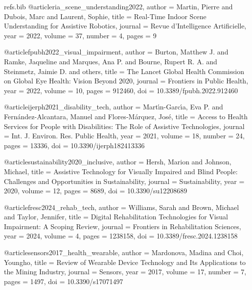 \begin{filecontents*}{refs.bib}
@article{ria_scene_understanding2022,
  author    = {Martin, Pierre and Dubois, Marc and Laurent, Sophie},
  title     = {Real-Time Indoor Scene Understanding for Assistive Robotics},
  journal   = {Revue d'Intelligence Artificielle},
  year      = {2022},
  volume    = {37},
  number    = {4},
  pages     = {9}
}


@article{fpubh2022_visual_impairment,
  author    = {Burton, Matthew J. and Ramke, Jaqueline and Marques, Ana P. and Bourne, Rupert R. A. and Steinmetz, Jaimie D. and others},
  title     = {The Lancet Global Health Commission on Global Eye Health: Vision Beyond 2020},
  journal   = {Frontiers in Public Health},
  year      = {2022},
  volume    = {10},
  pages     = {912460},
  doi       = {10.3389/fpubh.2022.912460}
}

@article{ijerph2021_disability_tech,
  author    = {Mart{\'\i}n-Garc{\'\i}a, Eva P. and Fern{\'a}ndez-Alcantara, Manuel and Flores-M{\'a}rquez, Jos{\'e}},
  title     = {Access to Health Services for People with Disabilities: The Role of Assistive Technologies},
  journal   = {Int. J. Environ. Res. Public Health},
  year      = {2021},
  volume    = {18},
  number    = {24},
  pages     = {13336},
  doi       = {10.3390/ijerph182413336}
}

@article{sustainability2020_inclusive,
  author    = {Hersh, Marion and Johnson, Michael},
  title     = {Assistive Technology for Visually Impaired and Blind People: Challenges and Opportunities in Sustainability},
  journal   = {Sustainability},
  year      = {2020},
  volume    = {12},
  pages     = {8689},
  doi       = {10.3390/su12208689}
}

@article{fresc2024_rehab_tech,
  author    = {Williams, Sarah and Brown, Michael and Taylor, Jennifer},
  title     = {Digital Rehabilitation Technologies for Visual Impairment: A Scoping Review},
  journal   = {Frontiers in Rehabilitation Sciences},
  year      = {2024},
  volume    = {4},
  pages     = {1238158},
  doi       = {10.3389/fresc.2024.1238158}
}

@article{sensors2017_health_wearable,
  author    = {Mardonova, Madina and Choi, Youngho},
  title     = {Review of Wearable Device Technology and Its Applications to the Mining Industry},
  journal   = {Sensors},
  year      = {2017},
  volume    = {17},
  number    = {7},
  pages     = {1497},
  doi       = {10.3390/s17071497}
}
\end{filecontents*}

